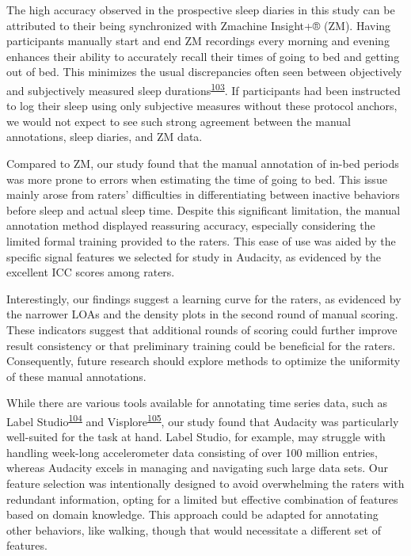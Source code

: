 \documentclass[
  9pt,
]{scrbook}
\begin{document}
The high accuracy observed in the prospective sleep diaries in this
study can be attributed to their being synchronized with Zmachine
Insight+® (ZM). Having participants manually start and end ZM recordings
every morning and evening enhances their ability to accurately recall
their times of going to bed and getting out of bed. This minimizes the
usual discrepancies often seen between objectively and subjectively
measured sleep
durations\textsuperscript{\protect\hyperlink{ref-aili_reliability_2017}{103}}.
If participants had been instructed to log their sleep using only
subjective measures without these protocol anchors, we would not expect
to see such strong agreement between the manual annotations, sleep
diaries, and ZM data.

Compared to ZM, our study found that the manual annotation of in-bed
periods was more prone to errors when estimating the time of going to
bed. This issue mainly arose from raters' difficulties in
differentiating between inactive behaviors before sleep and actual sleep
time. Despite this significant limitation, the manual annotation method
displayed reassuring accuracy, especially considering the limited formal
training provided to the raters. This ease of use was aided by the
specific signal features we selected for study in Audacity, as evidenced
by the excellent ICC scores among raters.

Interestingly, our findings suggest a learning curve for the raters, as
evidenced by the narrower LOAs and the density plots in the second round
of manual scoring. These indicators suggest that additional rounds of
scoring could further improve result consistency or that preliminary
training could be beneficial for the raters. Consequently, future
research should explore methods to optimize the uniformity of these
manual annotations.

While there are various tools available for annotating time series data,
such as Label
Studio\textsuperscript{\protect\hyperlink{ref-label_studio}{104}} and
Visplore\textsuperscript{\protect\hyperlink{ref-visplore}{105}}, our
study found that Audacity was particularly well-suited for the task at
hand. Label Studio, for example, may struggle with handling week-long
accelerometer data consisting of over 100 million entries, whereas
Audacity excels in managing and navigating such large data sets. Our
feature selection was intentionally designed to avoid overwhelming the
raters with redundant information, opting for a limited but effective
combination of features based on domain knowledge. This approach could
be adapted for annotating other behaviors, like walking, though that
would necessitate a different set of features.
\end{document}
